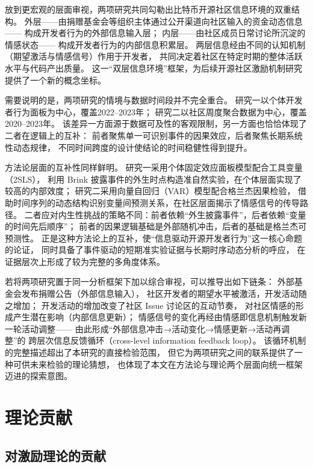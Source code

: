 放到更宏观的层面审视，两项研究共同勾勒出比特币开源社区信息环境的双重结构。
外层——由捐赠基金会等组织主体通过公开渠道向社区输入的资金动态信息——
构成开发者行为的外部信息输入层；
内层——由社区成员日常讨论所沉淀的情感状态——
构成开发者行为的内部信息积累层。
两层信息经由不同的认知机制（期望激活与情感信号）作用于开发者，
共同决定着社区在特定时期的整体活跃水平与代码产出质量。
这一“双层信息环境”框架，为后续开源社区激励机制研究提供了一个新的概念坐标。

需要说明的是，两项研究的情境与数据时间段并不完全重合。
研究一以个体开发者行为面板为中心，覆盖2022--2023年；
研究二以社区周度聚合数据为中心，覆盖2020--2023年。
该差异一方面源于数据可及性的客观限制，另一方面也恰恰体现了二者在逻辑上的互补：
前者聚焦单一可识别事件的因果效应，后者聚焦长期系统性动态规律，
不同时间跨度的设计使结论的时间稳健性得到提升。

方法论层面的互补性同样鲜明。
研究一采用个体固定效应面板模型配合工具变量（2SLS），
利用 Brink 披露事件的外生时点构造准自然实验，在个体层面实现了较高的内部效度；
研究二采用向量自回归（VAR）模型配合格兰杰因果检验，
借助时间序列的动态结构识别变量间预测关系，在社区层面揭示了情感信号的传导路径。
二者应对内生性挑战的策略不同：前者依赖“外生披露事件”，后者依赖“变量的时间先后顺序”；
前者的因果逻辑基础是外部随机冲击，后者的基础是格兰杰可预测性。
正是这种方法论上的互补，使“信息驱动开源开发者行为”这一核心命题的论证，
同时具备了事件驱动的短期准实验证据与长期时序动态分析的呼应，
在证据层次上形成了较为完整的多角度体系。

若将两项研究置于同一分析框架下加以综合审视，可以推导出如下链条：
外部基金会发布捐赠公告（外部信息输入），
社区开发者的期望水平被激活，开发活动随之增加；
开发活动的增加改变了社区 Issue 讨论区的互动节奏，
对社区情感的形成产生潜在影响（内部信息更新）；
情感信号的变化再经由情感即信息机制触发新一轮活动调整——
由此形成“外部信息冲击→活动变化→情感更新→活动再调整”的
跨层次信息反馈循环（cross-level information feedback loop）。
该循环机制的完整描述超出了本研究的直接检验范围，
但它为两项研究之间的联系提供了一种可供未来检验的理论猜想，
也体现了本文在方法论与理论两个层面向统一框架迈进的探索意图。


\section{理论贡献}

\subsection{对激励理论的贡献}

